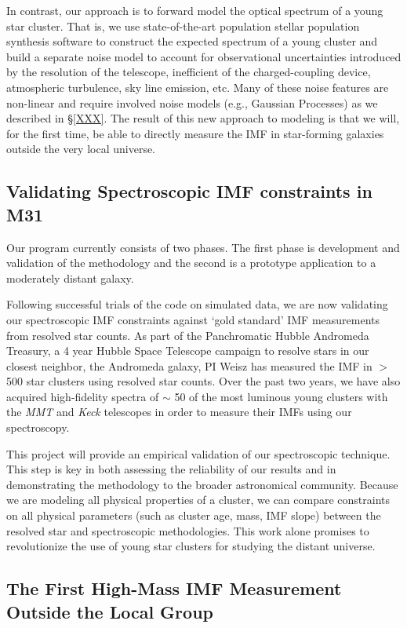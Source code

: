 \documentclass[11pt,preprint]{aastex}
\begin{document}
In contrast, our approach is to forward model the optical spectrum of a young star cluster.  That is, we use state-of-the-art population stellar population synthesis software to construct the expected spectrum of a young cluster and build a separate noise model to account for observational uncertainties introduced by the resolution of the telescope, inefficient of the charged-coupling device, atmospheric turbulence, sky line emission, etc.  Many of these noise features are non-linear and require involved noise models (e.g., Gaussian Processes) as we described in \S \ref{XXX}.  The result of this new approach to modeling is that we will, for the first time, be able to directly measure the IMF in star-forming galaxies outside the very local universe.  

\subsection{Validating Spectroscopic IMF constraints in M31}

Our program currently consists of two phases.  The first phase is development and validation of the methodology and the second is a prototype application to a moderately distant galaxy.

Following successful trials of the code on simulated data, we are now validating our spectroscopic IMF constraints against `gold standard' IMF measurements from resolved star counts.  As part of the Panchromatic Hubble Andromeda Treasury, a 4 year Hubble Space Telescope campaign to resolve stars in our closest neighbor, the Andromeda galaxy, PI Weisz has measured the IMF in $>$500 star clusters using resolved star counts.  Over the past two years, we have also acquired high-fidelity spectra of $\sim$ 50 of the most luminous young clusters with the \textit{MMT} and \textit{Keck} telescopes in order to measure their IMFs using our spectroscopy.  

This project will provide an empirical validation of our spectroscopic technique.  This step is key in both assessing the reliability of our results and in demonstrating the methodology to the broader astronomical community.  Because we are modeling all physical properties of a cluster, we can compare constraints on all physical parameters (such as cluster age, mass, IMF slope) between the resolved star and spectroscopic  methodologies.  This work alone promises to revolutionize the use of young star clusters for studying the distant universe.

\subsection{The First High-Mass IMF Measurement Outside the Local Group}
\end{document}
